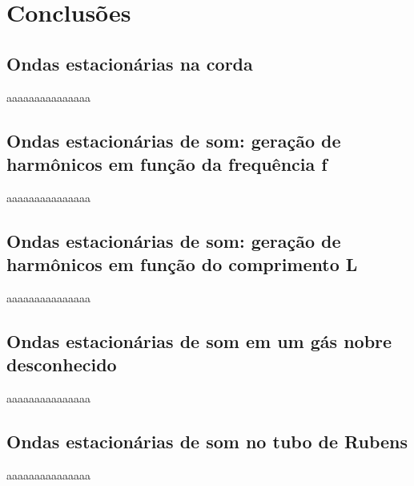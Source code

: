 \newpage
\section{Conclusões}

\subsection{Ondas estacionárias na corda}

aaaaaaaaaaaaaaa

\subsection{Ondas estacionárias de som: geração de harmônicos
em função da frequência f}

aaaaaaaaaaaaaaa

\subsection{Ondas estacionárias de som: geração de harmônicos em
função do comprimento L}

aaaaaaaaaaaaaaa

\subsection{Ondas estacionárias de som em um gás nobre
desconhecido}

aaaaaaaaaaaaaaa

\subsection{Ondas estacionárias de som no tubo de Rubens}

aaaaaaaaaaaaaaa
